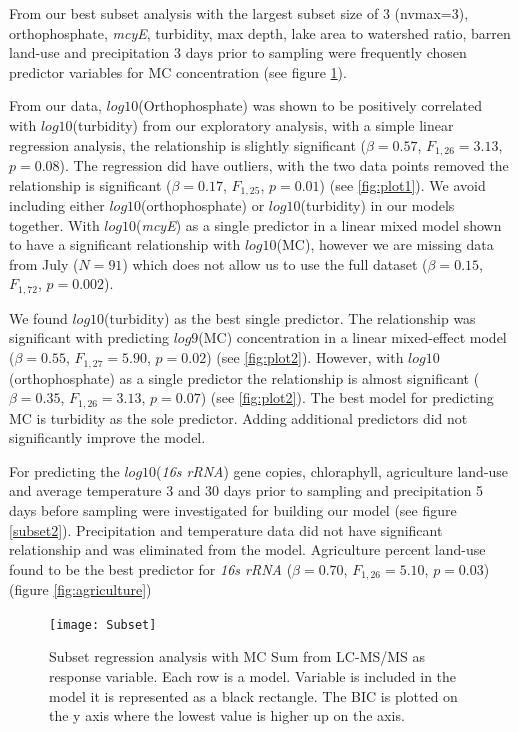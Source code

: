 From our best subset analysis with the largest subset size of 3 (nvmax=3),  orthophosphate, \emph{mcyE}, turbidity, max depth,  lake area to watershed ratio, barren land-use and precipitation 3 days prior to sampling were frequently chosen  predictor variables for MC concentration (see figure \ref{subset}).


From our data, $log10$(Orthophosphate) was shown to be positively correlated with $log10$(turbidity) from our exploratory analysis, with a simple linear regression analysis, the relationship is slightly significant ($\beta=0.57$, $F_{{1,26}}=3.13$, $p=0.08$). The regression did have outliers, with the two data points removed the relationship is significant ($\beta=0.17$, $F_{{1,25}}$, $p=0.01$) (see \ref{fig:plot1}). We avoid including either $log10$(orthophosphate) or $log10$(turbidity) in our models together.
With $log10$(\emph{mcyE}) as a single predictor in a linear mixed model shown to have a significant relationship with $log10$(MC), however we are missing data from July ($N=91$) which does not allow us to use the full dataset ($\beta=0.15$, $F_{{1,72}}$, $p=0.002$).

We found $log10$(turbidity) as the best single predictor. The relationship was significant with predicting $log9$(MC) concentration in a linear mixed-effect model ($\beta=0.55$, $F_{{1,27}}=5.90$, $p=0.02$) (see \ref{fig:plot2}). However, with $log10$(orthophosphate) as a single predictor the relationship is almost significant ($\beta=0.35$, $F_{{1,26}}=3.13$, $p=0.07$) (see \ref{fig:plot2}).  The best model for predicting MC is turbidity as the sole predictor. Adding additional predictors did not significantly improve the model.

For predicting the $log10$(\emph{16s rRNA}) gene copies, chloraphyll, agriculture land-use and average temperature 3 and 30 days prior to sampling and precipitation 5 days before sampling were investigated for building our model (see figure \ref{subset2}). Precipitation and temperature data did not have significant relationship and was eliminated from the model. Agriculture percent land-use found to be the best predictor for \emph{16s rRNA} ($\beta=0.70$, $F_{{1,26}}=5.10$, $p=0.03$)(figure \ref{fig:agriculture})


\begin{figure}[!ht]
  \texttt{[image: Subset]}
  \caption{Subset regression analysis with MC Sum from LC-MS/MS as response variable. Each row is a model. Variable is included in the model it is represented as a black rectangle. The BIC is plotted on the y axis where the lowest value is higher up on the axis.}
  \label{subset}
\end{figure}


